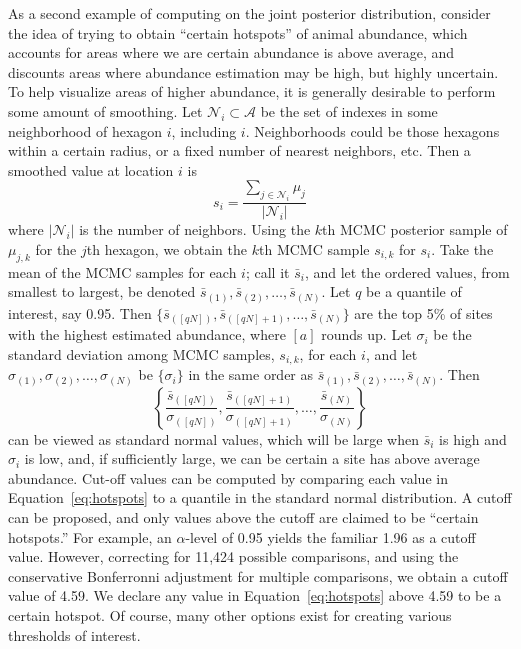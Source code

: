 \documentclass[11pt, titlepage]{article}
\begin{document}
\begin{spacing}{1.9}
\begin{flushleft}
As a second example of computing on the joint posterior distribution, consider the idea of trying to obtain ``certain hotspots'' of animal abundance, which accounts for areas where we are certain abundance is above average, and discounts areas where abundance estimation may be high, but highly uncertain.  To help visualize areas of higher abundance, it is generally desirable to perform some amount of smoothing.  Let $\mathcal{N}_{i} \subset \mathcal{A}$ be the set of indexes in some neighborhood of hexagon $i$, including $i$. Neighborhoods could be those hexagons within a certain radius, or a fixed number of nearest neighbors, etc. Then a smoothed value at location $i$ is
\begin{equation} \label{eq:smoomui}
s_{i} = \frac{\sum_{j \in \mathcal{N}_{i}}\mu_{j}}{|\mathcal{N}_{i}|}
\end{equation}
where $|\mathcal{N}_{i}|$ is the number of neighbors.  Using the $k$th MCMC posterior sample of $\mu_{j,k}$ for the $j$th hexagon, we obtain the $k$th MCMC sample $s_{i,k}$ for $s_{i}$.  Take the mean of the MCMC samples for each $i$; call it $\bar{s}_i$, and let the ordered values, from smallest to largest, be denoted $\bar{s}_{(1)}, \bar{s}_{(2)}, \ldots, \bar{s}_{(N)}$.  Let $q$ be a quantile of interest, say 0.95. Then $\{\bar{s}_{([qN])}, \bar{s}_{([qN]+1)}, \ldots, \bar{s}_{(N)}\}$ are the top 5\% of sites with the highest estimated abundance, where $[a]$ rounds up. Let $\sigma_i$ be the standard deviation among MCMC samples, $s_{i,k}$, for each $i$, and let $\sigma_{(1)}, \sigma_{(2)}, \ldots, \sigma_{(N)}$ be $\{\sigma_i\}$ in the same order as $\bar{s}_{(1)}, \bar{s}_{(2)}, \ldots, \bar{s}_{(N)}$. Then 
\begin{equation} \label{eq:hotspots}
\left\{ \frac{\bar{s}_{([qN])}}{\sigma_{([qN])}}, \frac{\bar{s}_{([qN]+1)}}{\sigma_{([qN]+1)}}, \ldots, \frac{\bar{s}_{(N)}}{\sigma_{(N)}} \right\}
\end{equation}
can be viewed as standard normal values, which will be large when $\bar{s}_i$ is high and $\sigma_{i}$ is low, and, if sufficiently large, we can be certain a site has above average abundance. Cut-off values can be computed by comparing each value in Equation~\eqref{eq:hotspots} to a quantile in the standard normal distribution. A cutoff can be proposed, and only values above the cutoff are claimed to be ``certain hotspots.''  For example, an $\alpha$-level of 0.95 yields the familiar 1.96 as a cutoff value.  However, correcting for 11,424 possible comparisons, and using the conservative Bonferronni adjustment for multiple comparisons, we obtain a cutoff value of 4.59.  We declare any value in Equation~\eqref{eq:hotspots} above 4.59 to be a certain hotspot.  Of course, many other options exist for creating various thresholds of interest.


\end{flushleft}
\end{spacing}
\end{document}

